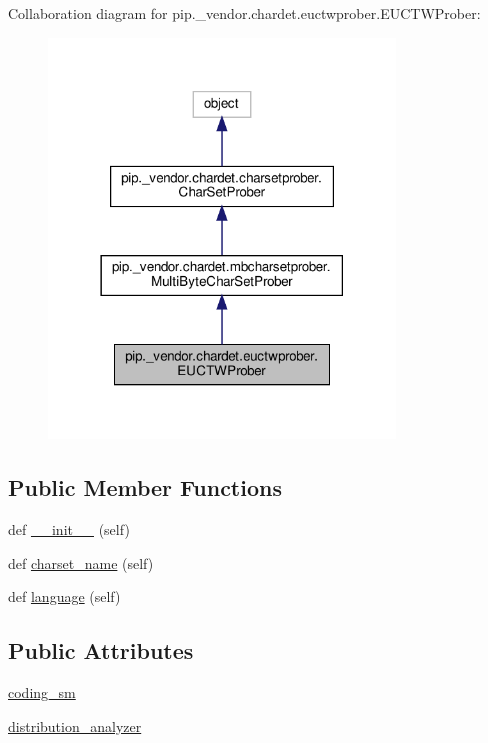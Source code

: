 Collaboration diagram for pip.\+\_\+vendor.\+chardet.\+euctwprober.\+E\+U\+C\+T\+W\+Prober\+:
\nopagebreak
\begin{figure}[H]
\begin{center}
\leavevmode
\includegraphics[width=261pt]{classpip_1_1__vendor_1_1chardet_1_1euctwprober_1_1EUCTWProber__coll__graph}
\end{center}
\end{figure}
\subsection*{Public Member Functions}
\begin{DoxyCompactItemize}
\item 
def \hyperlink{classpip_1_1__vendor_1_1chardet_1_1euctwprober_1_1EUCTWProber_a44f26c6e76a9f99e579aba3955e188ce}{\+\_\+\+\_\+init\+\_\+\+\_\+} (self)
\item 
def \hyperlink{classpip_1_1__vendor_1_1chardet_1_1euctwprober_1_1EUCTWProber_a75abf302dbc6d4f33a7fbc6518d07226}{charset\+\_\+name} (self)
\item 
def \hyperlink{classpip_1_1__vendor_1_1chardet_1_1euctwprober_1_1EUCTWProber_aabf34a5568ac9527ce72e36254031795}{language} (self)
\end{DoxyCompactItemize}
\subsection*{Public Attributes}
\begin{DoxyCompactItemize}
\item 
\hyperlink{classpip_1_1__vendor_1_1chardet_1_1euctwprober_1_1EUCTWProber_ae21963e334c606ea3dadc39eb69c8fb9}{coding\+\_\+sm}
\item 
\hyperlink{classpip_1_1__vendor_1_1chardet_1_1euctwprober_1_1EUCTWProber_a0397b96da7d695dbbc22308df7ba8aca}{distribution\+\_\+analyzer}
\end{DoxyCompactItemize}
